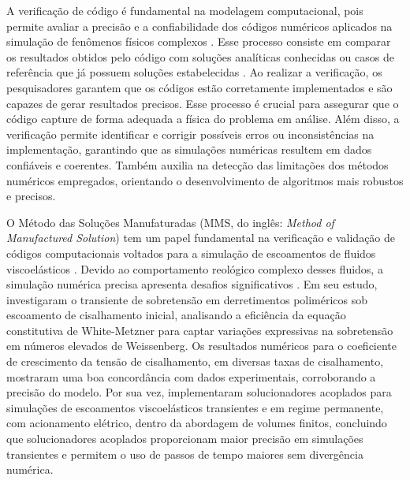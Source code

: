 A verificação de código é fundamental na modelagem computacional, pois permite avaliar a precisão e a confiabilidade dos códigos numéricos aplicados na simulação de fenômenos físicos complexos \cite{Khoshghalb2019, Tranquilli2022}. Esse processo consiste em comparar os resultados obtidos pelo código com soluções analíticas conhecidas ou casos de referência que já possuem soluções estabelecidas \cite{Fernandes2018, Pedro2020}. Ao realizar a verificação, os pesquisadores garantem que os códigos estão corretamente implementados e são capazes de gerar resultados precisos. Esse processo é crucial para assegurar que o código capture de forma adequada a física do problema em análise. Além disso, a verificação permite identificar e corrigir possíveis erros ou inconsistências na implementação, garantindo que as simulações numéricas resultem em dados confiáveis e coerentes. Também auxilia na detecção das limitações dos métodos numéricos empregados, orientando o desenvolvimento de algoritmos mais robustos e precisos.

O Método das Soluções Manufaturadas (MMS, do inglês: \textit{Method of Manufactured Solution}) tem um papel fundamental na verificação e validação de códigos computacionais voltados para a simulação de escoamentos de fluidos viscoelásticos \cite{Garcia2022}. Devido ao comportamento reológico complexo desses fluidos, a simulação numérica precisa apresenta desafios significativos \cite{Fernandes2017}. Em seu estudo,  investigaram o transiente de sobretensão em derretimentos poliméricos sob escoamento de cisalhamento inicial, analisando a eficiência da equação constitutiva de White-Metzner para captar variações expressivas na sobretensão em números elevados de Weissenberg. Os resultados numéricos para o coeficiente de crescimento da tensão de cisalhamento, em diversas taxas de cisalhamento, mostraram uma boa concordância com dados experimentais, corroborando a precisão do modelo. Por sua vez,  implementaram solucionadores acoplados para simulações de escoamentos viscoelásticos transientes e em regime permanente, com acionamento elétrico, dentro da abordagem de volumes finitos, concluindo que solucionadores acoplados proporcionam maior precisão em simulações transientes e permitem o uso de passos de tempo maiores sem divergência numérica.

